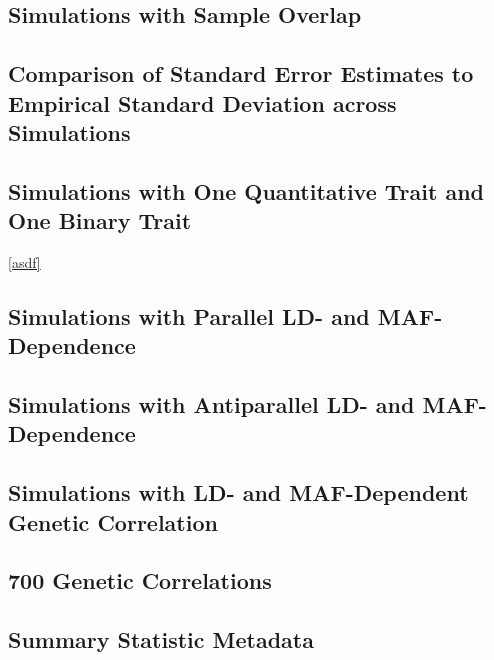 \documentclass[11pt]{article}
\numberwithin{equation}{section}
\numberwithin{definition}{section}
\numberwithin{thm}{section}
\numberwithin{lemma}{section}
\numberwithin{prop}{section}
\numberwithin{cor}{section}
\numberwithin{hyp}{section}
\begin{document}
\subsection{Simulations with Sample Overlap}

\newpage

\subsection{Comparison of Standard Error Estimates to Empirical Standard Deviation across Simulations}



\newpage
\subsection{Simulations with One Quantitative Trait and One Binary Trait}
\ref{asdf}


\newpage
\subsection{Simulations with Parallel LD- and MAF-Dependence}
\label{parallel}



\newpage
\subsection{Simulations with Antiparallel LD- and MAF-Dependence}



\newpage
\subsection{Simulations with LD- and MAF-Dependent Genetic Correlation}
\label{antiparallel}



\newpage
\subsection{700 Genetic Correlations}

\newpage
\subsection{Summary Statistic Metadata}


\newpage


\end{document}

